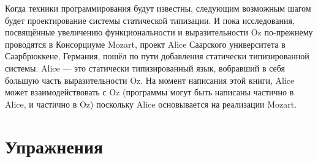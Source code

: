 Когда техники программирования будут известны, следующим возможным шагом будет проектирование системы статической типизации. И пока исследования, посвящённые увеличению функциональности и выразительности Oz по-прежнему проводятся в Консорциуме Mozart, проект Alice Саарского университета в Саарбрюккене, Германия, пошёл по пути добавления статически типизированной системы. Alice --- это статически типизированный язык, вобравший в себя большую часть выразительности Oz. На момент написания этой книги, Alice может взаимодействовать с Oz (программы могут быть написаны частично в Alice, и частично в Oz) поскольку Alice основывается на реализации Mozart.

\section{Упражнения}

